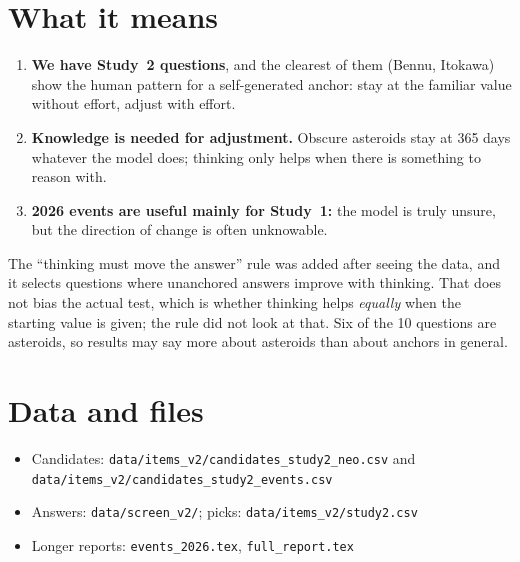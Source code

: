 \documentclass[11pt,a4paper]{article}
\begin{document}
\section{What it means}
\begin{enumerate}[leftmargin=*]
  \item \textbf{We have Study~2 questions}, and the clearest of them (Bennu, Itokawa) show the human pattern for a self-generated anchor: stay at the familiar value without effort, adjust with effort.
  \item \textbf{Knowledge is needed for adjustment.} Obscure asteroids stay at 365 days whatever the model does; thinking only helps when there is something to reason with.
  \item \textbf{2026 events are useful mainly for Study~1:} the model is truly unsure, but the direction of change is often unknowable.
\end{enumerate}

\begin{cautionbox}
The \enquote{thinking must move the answer} rule was added after seeing the data, and it selects questions where unanchored answers improve with thinking. That does not bias the actual test, which is whether thinking helps \emph{equally} when the starting value is given; the rule did not look at that. Six of the 10 questions are asteroids, so results may say more about asteroids than about anchors in general.
\end{cautionbox}

\appendix
\section{Data and files}
\begin{itemize}[leftmargin=*]
  \item Candidates: \texttt{data/items\_v2/candidates\_study2\_neo.csv} and\\ \texttt{data/items\_v2/candidates\_study2\_events.csv}
  \item Answers: \texttt{data/screen\_v2/}; picks: \texttt{data/items\_v2/study2.csv}
  \item Longer reports: \texttt{events\_2026.tex}, \texttt{full\_report.tex}
\end{itemize}



\end{document}
